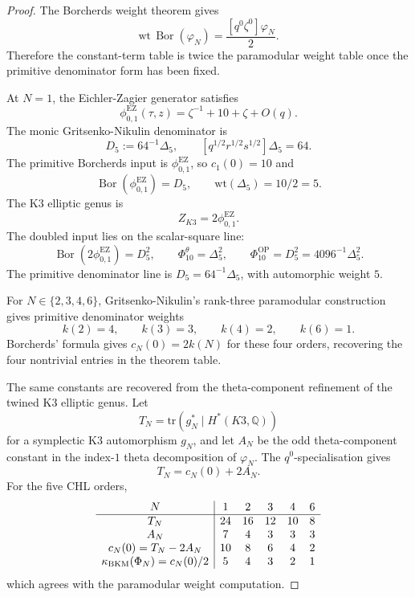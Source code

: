 \begin{proof}
The Borcherds weight theorem gives
\[
  \mathrm{wt}\,\operatorname{Bor}(\varphi_N)
  =\frac{[q^0\zeta^0]\varphi_N}{2}.
\]
Therefore the constant-term table is twice the paramodular weight table
once the primitive denominator form has been fixed.

At $N=1$, the Eichler-Zagier generator satisfies
\[
  \phi_{0,1}^{\mathrm{EZ}}(\tau,z)
  =\zeta^{-1}+10+\zeta+O(q).
\]
The monic Gritsenko-Nikulin denominator is
\[
  D_5:=64^{-1}\Delta_5,\qquad
  [q^{1/2}r^{1/2}s^{1/2}]\Delta_5=64.
\]
The primitive Borcherds input is \(\phi_{0,1}^{\mathrm{EZ}}\), so
\(c_1(0)=10\) and
\[
  \operatorname{Bor}(\phi_{0,1}^{\mathrm{EZ}})=D_5,\qquad
  \mathrm{wt}(\Delta_5)=10/2=5.
\]
The K3 elliptic genus is
\[
  Z_{K3}=2\phi_{0,1}^{\mathrm{EZ}}.
\]
The doubled input lies on the scalar-square line:
\[
  \operatorname{Bor}(2\phi_{0,1}^{\mathrm{EZ}})=D_5^2,\qquad
  \Phi_{10}^{\theta}=\Delta_5^2,\qquad
  \Phi_{10}^{\mathrm{OP}}=D_5^2=4096^{-1}\Delta_5^2.
\]
The primitive denominator line is \(D_5=64^{-1}\Delta_5\), with
automorphic weight \(5\).

For \(N\in\{2,3,4,6\}\), Gritsenko-Nikulin's rank-three
paramodular construction gives primitive denominator weights
\[
  k(2)=4,\qquad k(3)=3,\qquad k(4)=2,\qquad k(6)=1.
\]
Borcherds' formula gives \(c_N(0)=2k(N)\) for these four orders,
recovering the four nontrivial entries in the theorem table.

The same constants are recovered from the theta-component refinement of
the twined K3 elliptic genus.  Let
\[
  T_N=\mathrm{tr}\!\left(g_N^\ast\mid H^\ast(K3,\mathbb Q)\right)
\]
for a symplectic K3 automorphism \(g_N\), and let \(A_N\) be the
odd theta-component constant in the index-$1$ theta decomposition of
\(\varphi_N\).  The \(q^0\)-specialisation gives
\[
  T_N=c_N(0)+2A_N.
\]
For the five CHL orders,
\[
\begin{array}{c|ccccc}
N & 1 & 2 & 3 & 4 & 6 \\ \hline
T_N & 24 & 16 & 12 & 10 & 8 \\
A_N & 7 & 4 & 3 & 3 & 3 \\
c_N(0)=T_N-2A_N & 10 & 8 & 6 & 4 & 2 \\
\kappa_{\mathrm{BKM}}(\Phi_N)=c_N(0)/2 & 5 & 4 & 3 & 2 & 1
\end{array}
\]
which agrees with the paramodular weight computation.
\end{proof}

